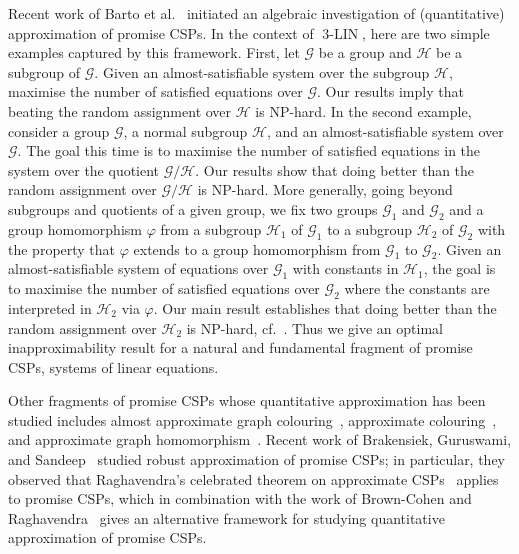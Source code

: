 \documentclass[a4paper,11pt]{article}
\theoremstyle{definition}
\newcommand{\gr}{\mathscr{G}}
\newcommand{\sgr}{\mathscr{H}}
\newcommand{\eq}{\ensuremath{\operatorname{3-LIN}}}
\begin{document}
Recent work of Barto et al.~\cite{Barto24:lics} initiated an algebraic
investigation of (quantitative)
approximation of promise CSPs. In the context of $\eq$, 
here are two simple examples captured by this framework. First, let $\gr$ be a group and $\sgr$ be a subgroup of $\gr$. Given an almost-satisfiable system over the subgroup $\sgr$, maximise the number of satisfied equations over $\gr$. Our results imply that beating the random assignment over $\sgr$ is NP-hard. In the second example, consider a group $\gr$, a normal subgroup $\sgr$, and an almost-satisfiable system over $\gr$. The goal this time is to maximise the number of satisfied equations in the system over the quotient $\gr/\sgr$. Our results show that doing better than the random assignment over $\gr/\sgr$ is NP-hard. More generally, going beyond subgroups and quotients of a given group, we fix two groups $\gr_1$ and $\gr_2$ and a group homomorphism $\varphi$ from a subgroup $\sgr_1$ of $\gr_1$ to a subgroup $\sgr_2$ of $\gr_2$ with the property that $\varphi$ extends to a group homomorphism from $\gr_1$ to $\gr_2$. Given an almost-satisfiable system of equations over $\gr_1$ with constants in $\sgr_1$, the goal is to maximise the number of satisfied equations over $\gr_2$ where the constants are 
interpreted in $\sgr_2$ via $\varphi$. Our main result establishes that doing better than the random assignment over $\sgr_2$ is NP-hard, cf.~. Thus we give an optimal inapproximability result for a natural and fundamental fragment of promise CSPs, systems of linear equations.

Other fragments of promise CSPs whose quantitative approximation has been studied includes almost approximate graph colouring~\cite{Engebretsen08:rsa,Dinur10:focs,Khot12:focs,Hecht23:approx}, approximate colouring~\cite{nz23:arxiv}, and approximate graph homomorphism~\cite{nz25:icalp}. Recent work of Brakensiek, Guruswami, and Sandeep~\cite{BGS23:stoc} studied robust approximation of promise CSPs; in particular, they observed that Raghavendra's celebrated theorem on approximate CSPs~\cite{Raghavendra08:everycsp} applies to promise CSPs, which in combination with the work of Brown-Cohen and Raghavendra~\cite{BCR15} gives an alternative framework for studying quantitative approximation of promise CSPs.


\medskip
\end{document}
